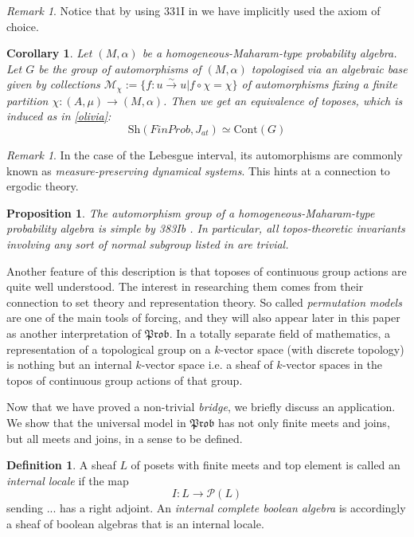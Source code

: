 \documentclass[a4paper]{amsproc}
\theoremstyle{plain}
\newtheorem{proposition}[theorem]{Proposition}
\newtheorem{corollary}[theorem]{Corollary}
\theoremstyle{definition}
\newtheorem{definition}[theorem]{Definition}
\theoremstyle{remark}
\newtheorem{remark}[theorem]{Remark}
\numberwithin{equation}{section}
\begin{document}
\begin{remark}
Notice that by using 331I in \cite{fremlin} we have implicitly used the axiom of choice.
\end{remark}

\begin{corollary}\label{Galois} Let $(M, \alpha)$ be a homogeneous-Maharam-type probability algebra. Let $G$ be the group of automorphisms of $(M, \alpha)$ topologised via an algebraic base given by collections $\mathcal{M}_{\chi}:=\{f:u\overset{\sim}{\rightarrow} u| f\circ \chi=\chi\} $ of automorphisms fixing a finite partition $\chi: (A,\mu)\rightarrow (M, \alpha)$. Then we get an equivalence of toposes, which is induced as in \ref{olivia}:
\[\text{Sh}(FinProb, J_{at})\simeq \text{Cont}(G)\]
\end{corollary}
\begin{remark} In the case of the Lebesgue interval, its automorphisms are commonly known as \emph{measure-preserving dynamical systems}. This hints at a connection to ergodic theory.
\end{remark}
\begin{proposition} The automorphism group of a homogeneous-Maharam-type probability algebra is simple by 383Ib \cite{fremlin}. In particular, all topos-theoretic invariants involving any sort of normal subgroup listed in \cite{caramello_lafforgue} are trivial.
\end{proposition}

Another feature of this description is that toposes of continuous group actions are quite well understood. The interest in researching them comes from their connection to set theory and representation theory. So called \emph{permutation models} are one of the main tools of forcing, and they will also appear later in this paper as another interpretation of $\mathfrak{Prob}$. In a totally separate field of mathematics, a representation of a topological group on a $k$-vector space (with discrete topology) is nothing but an internal $k$-vector space \cite{XYZ} i.e. a sheaf of $k$-vector spaces in the topos of continuous group actions of that group.

Now that we have proved a non-trivial \emph{bridge}, we briefly discuss an application. We show that the universal model in $\mathfrak{Prob}$ has not only finite meets and joins, but all meets and joins, in a sense to be defined.

\begin{definition} A sheaf $L$ of posets with finite meets and top element is called an \emph{internal locale} if the map 
\[I: L\rightarrow \mathcal{P}(L) \]
sending ... has a right adjoint. An \emph{internal complete boolean algebra} is accordingly a sheaf of boolean algebras that is an internal locale.
\end{definition}
\end{document}
